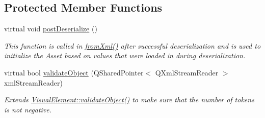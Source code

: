 \subsection*{Protected Member Functions}
\begin{DoxyCompactItemize}
\item 
virtual void \hyperlink{class_picto_1_1_token_factory_graphic_a4ae62593cf690db4a25630fb5a6f9d71}{post\-Deserialize} ()
\begin{DoxyCompactList}\small\item\em This function is called in \hyperlink{class_picto_1_1_asset_a8bed4da09ecb1c07ce0dab313a9aba67}{from\-Xml()} after successful deserialization and is used to initialize the \hyperlink{class_picto_1_1_asset}{Asset} based on values that were loaded in during deserialization. \end{DoxyCompactList}\item 
\hypertarget{class_picto_1_1_token_factory_graphic_a58b7fc8159f457b4a69bf20aa41b99f0}{virtual bool \hyperlink{class_picto_1_1_token_factory_graphic_a58b7fc8159f457b4a69bf20aa41b99f0}{validate\-Object} (Q\-Shared\-Pointer$<$ Q\-Xml\-Stream\-Reader $>$ xml\-Stream\-Reader)}\label{class_picto_1_1_token_factory_graphic_a58b7fc8159f457b4a69bf20aa41b99f0}

\begin{DoxyCompactList}\small\item\em Extends \hyperlink{struct_picto_1_1_visual_element_a681b115b3f3ea6d24ab803cab9d6ee5b}{Visual\-Element\-::validate\-Object()} to make sure that the number of tokens is not negative. \end{DoxyCompactList}\end{DoxyCompactItemize}
